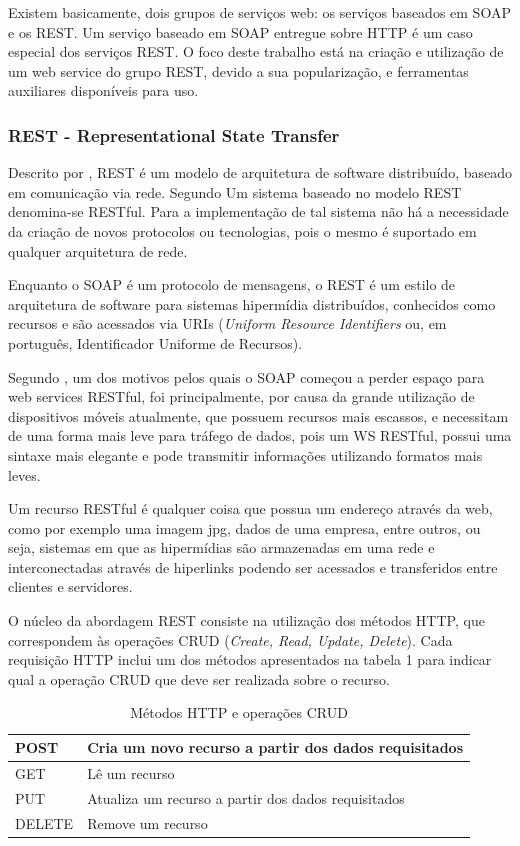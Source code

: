 \documentclass[12pt]{article}
\begin{document}
Existem basicamente, dois grupos de serviços web: os serviços baseados em SOAP e os REST. Um serviço baseado em SOAP entregue sobre HTTP é um caso especial dos serviços REST. O foco deste trabalho está na criação e utilização de um web service do grupo REST, devido a sua popularização, e ferramentas auxiliares disponíveis para uso.

\subsubsection{REST - Representational State Transfer}

Descrito por \cite{rest}, REST é um modelo de arquitetura de software distribuído, baseado em comunicação via rede.
Segundo \cite{richard:07} Um sistema baseado no modelo REST denomina-se RESTful. Para a implementação de tal sistema não há a necessidade da criação de novos protocolos ou tecnologias, pois o mesmo é suportado em qualquer arquitetura de rede.

Enquanto o SOAP é um protocolo de mensagens, o REST é um estilo de arquitetura
de software para sistemas hipermídia distribuídos, conhecidos como recursos e são acessados via URIs (\textit{Uniform Resource Identifiers} ou, em português, Identificador Uniforme de Recursos). 

Segundo \cite{lecheta:15}, um dos motivos pelos quais o SOAP começou a perder espaço para web services RESTful, foi principalmente, por causa da grande utilização de dispositivos móveis atualmente, que possuem recursos mais escassos, e necessitam de uma forma mais leve para tráfego de dados, pois um WS RESTful, possui uma sintaxe mais elegante e pode transmitir informações utilizando formatos mais leves.

Um recurso RESTful é qualquer coisa que possua um endereço através da web, como por exemplo uma imagem jpg, dados de uma empresa, entre outros, ou seja, sistemas em que as hipermídias são armazenadas em uma rede e interconectadas através de hiperlinks podendo ser acessados e transferidos entre clientes e servidores.

O núcleo da abordagem REST consiste na utilização dos métodos HTTP, que correspondem às operações CRUD (\textit{Create, Read, Update, Delete}). Cada requisição HTTP inclui um dos métodos apresentados na tabela 1 para indicar qual a operação CRUD que deve ser realizada sobre o recurso.
\begin{table}[ht]
	\centering
	\caption{Métodos HTTP e operações CRUD}
	\label{tab:Table1}
	\smallskip
	\begin{tabular}{ |l|l| }
		\hline
		POST & Cria um novo recurso a partir dos dados requisitados \\ \hline
		GET & Lê um recurso \\ \hline
		PUT & Atualiza um recurso a partir dos dados requisitados \\ \hline
		DELETE & Remove um recurso \\
		\hline
	\end{tabular}
\end{table}
\end{document}
